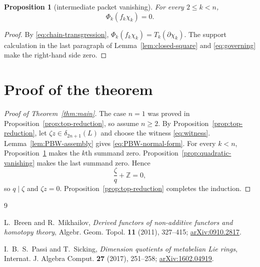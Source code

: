\documentclass[11pt]{amsart}
\newtheorem{proposition}[theorem]{Proposition}
\theoremstyle{remark}
\newcommand{\Z}{\mathbb Z}
\begin{document}
\begin{proposition}[intermediate packet vanishing]
\label{prop:intermediate-vanishing}
For every $2\leq k<n$,
\[
                         \Phi_k(f_k\chi_k)=0.
\]
\end{proposition}

\begin{proof}
By \eqref{eq:chain-transgression},
$\Phi_k(f_k\chi_k)=T_k(\partial\chi_k)$.  The support calculation in
the last paragraph of Lemma~\ref{lem:closed-square} and
\eqref{eq:governing} make the right-hand side zero.
\end{proof}

\section{Proof of the theorem}

\begin{proof}[Proof of Theorem~\ref{thm:main}]
The case $n=1$ was proved in Proposition~\ref{prop:top-reduction}, so
assume $n\geq2$.
By Proposition~\ref{prop:top-reduction}, let
$\zeta z\in\delta_{2n+1}(L)$ and choose the witness
\eqref{eq:witness}.  Lemma~\ref{lem:PBW-assembly} gives
\eqref{eq:PBW-normal-form}.  For every $k<n$,
Proposition~\ref{prop:intermediate-vanishing} makes the $k$th summand zero.
Proposition~\ref{prop:quadratic-vanishing} makes the last summand zero.
Hence
\[
                         \frac\zeta q+\Z=0,
\]
so $q\mid\zeta$ and $\zeta z=0$.
Proposition~\ref{prop:top-reduction} completes the induction.
\end{proof}

\begin{thebibliography}{9}

L.~Breen and R.~Mikhailov,
\emph{Derived functors of non-additive functors and homotopy theory},
Algebr. Geom. Topol. \textbf{11} (2011), 327--415;
\href{https://arxiv.org/abs/0910.2817}{arXiv:0910.2817}.

I.~B.~S.~Passi and T.~Sicking,
\emph{Dimension quotients of metabelian Lie rings},
Internat. J. Algebra Comput. \textbf{27} (2017), 251--258;
\href{https://arxiv.org/abs/1602.04919}{arXiv:1602.04919}.

\end{thebibliography}
\end{document}
